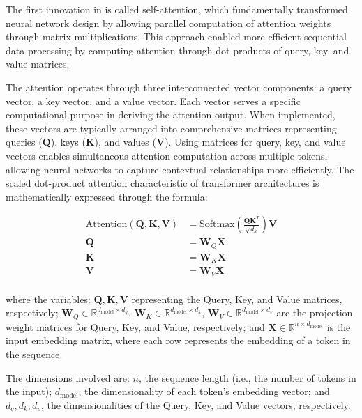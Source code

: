 The first innovation in \cite{vaswani2017attention} is called self-attention, which fundamentally transformed neural network design by allowing parallel computation of attention weights through matrix multiplications. This approach enabled more efficient sequential data processing by computing attention through dot products of query, key, and value matrices.
\newline

The attention operates through three interconnected vector components: a query vector, a key vector, and a value vector. Each vector serves a specific computational purpose in deriving the attention output. When implemented, these vectors are typically arranged into comprehensive matrices representing queries (\textbf{Q}), keys (\textbf{K}), and values (\textbf{V}). Using matrices for query, key, and value vectors enables simultaneous attention computation across multiple tokens, allowing neural networks to capture contextual relationships more efficiently. The scaled dot-product attention characteristic of transformer architectures is mathematically expressed through the formula: 

\begin{equation}
\begin{aligned}
\text{Attention}(\textbf{Q}, \textbf{K}, \textbf{V}) &= \text{Softmax}\left(\frac{\textbf{Q}\textbf{K}^T}{\sqrt{d_k}}\right)\textbf{V} \\
\textbf{Q} &= \textbf{W}_Q\textbf{X} \\
\textbf{K} &= \textbf{W}_K\textbf{X} \\
\textbf{V} &= \textbf{W}_V\textbf{X} \\
\end{aligned}
\end{equation}


where the variables: $\textbf{Q}, \textbf{K}, \textbf{V}$ representing the Query, Key, and Value matrices, respectively; $\textbf{W}_Q \in \mathbb{R}^{d_{\text{model}} \times d_q}$, $\textbf{W}_K \in \mathbb{R}^{d_{\text{model}} \times d_k}$, $\textbf{W}_V \in \mathbb{R}^{d_{\text{model}} \times d_v}$ are the projection weight matrices for Query, Key, and Value, respectively; and $\textbf{X} \in \mathbb{R}^{n \times d_{\text{model}}}$ is the input embedding matrix, where each row represents the embedding of a token in the sequence.

The dimensions involved are: $n$, the sequence length (i.e., the number of tokens in the input); $d_{\text{model}}$, the dimensionality of each token's embedding vector; and $d_q, d_k, d_v$, the dimensionalities of the Query, Key, and Value vectors, respectively.

